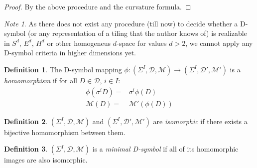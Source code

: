 \documentclass[12pt,a4paper]{article}
\numberwithin{equation}{section}
\theoremstyle{plain}%
\theoremstyle{definition}
\newtheorem{defn}{Definition}[section]
\theoremstyle{remark}
\newtheorem*{note}{Note}
\begin{document}
\begin{proof}
  By the above procedure and the curvature formula.

%
\end{proof}

\begin{note}
  As there does not exist any procedure (till now) to decide whether a D-symbol
  (or any representation of a tiling that the author knows of) is realizable in
  $S^d$, $E^d$, $H^d$ or other homogeneus $d$-space for values $d>2$, we cannot
  apply any D-symbol criteria in higher dimensions yet.
\end{note}

\begin{defn}
  The D-symbol mapping $\phi: (\Sigma^I,\mathcal{D},\mathcal{M}) \rightarrow
  (\Sigma^I,\mathcal{D}',\mathcal{M}')$ is a {\em homomorphism} if for all $D\in
  \mathcal{D}$, $i \in I$:
  \begin{align}
    \phi(\sigma^iD)= & \sigma^i\phi(D) \\
    \mathcal{M}(D)= & \mathcal{M}'(\phi(D))
  \end{align}
\end{defn}


\begin{defn}
  $(\Sigma^I,\mathcal{D},\mathcal{M})$ and
  $(\Sigma^I,\mathcal{D}',\mathcal{M}')$ are {\em isomorphic} if there exists a
  bijective homomorphism between them.
\end{defn}


\begin{defn}
  \label{def:max_D-sym}
  $(\Sigma^I,\mathcal{D},\mathcal{M})$ is a {\em minimal D-symbol} if all of its
  homomorphic images are also isomorphic.
\end{defn}
\end{document}
